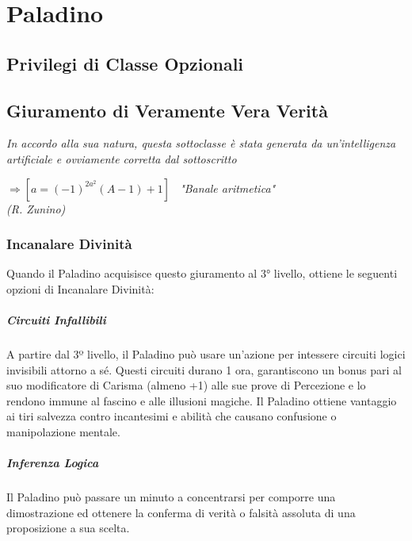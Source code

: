 \chapter{Paladino}

\section{Privilegi di Classe Opzionali}

\section{Giuramento di Veramente Vera Verità}

\textit{In accordo alla sua natura, questa sottoclasse è stata generata da un'intelligenza artificiale e ovviamente corretta dal sottoscritto}

\begin{DndReadAloud}
  \it
  \begin{math}[a = A] \Rightarrow [a = (-1)^{2a^2}(A-1)+1]\end{math} \ "Banale aritmetica" \\ (R. Zunino)
\end{DndReadAloud}

\subsection{Incanalare Divinità}
Quando il Paladino acquisisce questo giuramento al 3° livello, ottiene le seguenti opzioni di Incanalare Divinità:
\paragraph{Circuiti Infallibili}A partire dal 3º livello, il Paladino può usare un'azione per intessere circuiti logici invisibili attorno a sé. Questi circuiti durano 1 ora, garantiscono un bonus pari al suo modificatore di Carisma (almeno +1) alle sue prove di Percezione e lo rendono immune al fascino e alle illusioni magiche. Il Paladino ottiene vantaggio ai tiri salvezza contro incantesimi e abilità che causano confusione o manipolazione mentale.
\paragraph{Inferenza Logica} Il Paladino può passare un minuto a concentrarsi per comporre una dimostrazione ed ottenere la conferma di verità o falsità assoluta di una proposizione a sua scelta.

